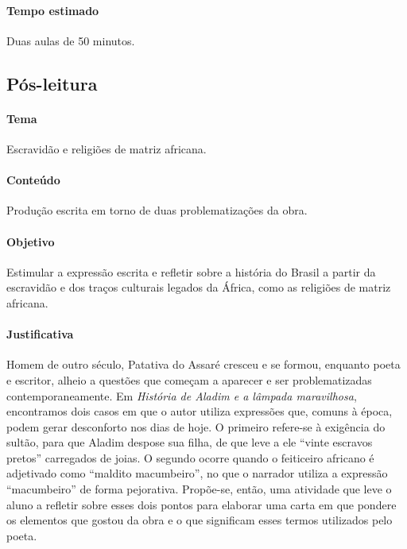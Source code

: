 \documentclass[11pt]{extarticle}
\begin{document}
\paragraph{Tempo estimado} Duas aulas de 50 minutos.




\subsection{Pós-leitura}


\paragraph{Tema} Escravidão e religiões de matriz africana.

\paragraph{Conteúdo} Produção escrita em torno de duas problematizações da obra.

\paragraph{Objetivo} Estimular a expressão escrita e refletir sobre a história do Brasil a partir da escravidão e dos traços culturais legados da África, como as religiões de matriz africana.

\paragraph{Justificativa} Homem de outro século, Patativa do Assaré cresceu e se formou, enquanto poeta e escritor, alheio a questões que começam a aparecer e ser problematizadas contemporaneamente. Em \textit{História de Aladim e a lâmpada maravilhosa}, encontramos dois casos em que o autor utiliza expressões que, comuns à época, podem gerar desconforto nos dias de hoje. O primeiro refere-se à exigência do sultão, para que Aladim despose sua filha, de que leve a ele ``vinte escravos pretos'' carregados de joias. O segundo ocorre quando o feiticeiro africano é adjetivado como ``maldito macumbeiro'', no que o narrador utiliza a expressão ``macumbeiro'' de forma pejorativa.
Propõe-se, então, uma atividade que leve o aluno a refletir sobre esses dois pontos para elaborar uma carta em que pondere os elementos que gostou da obra e o que significam esses termos utilizados pelo poeta.
\end{document}
